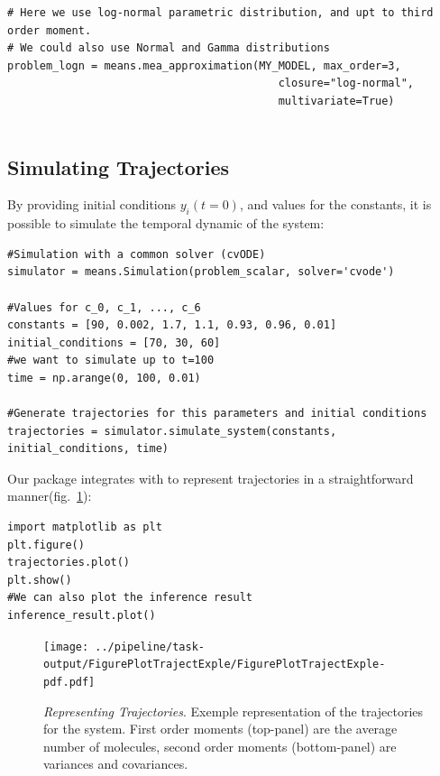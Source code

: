 \begin{framed}
\begin{verbatim}
# Here we use log-normal parametric distribution, and upt to third order moment.
# We could also use Normal and Gamma distributions
problem_logn = means.mea_approximation(MY_MODEL, max_order=3,
                                          closure="log-normal",
                                          multivariate=True)
                                          
\end{verbatim}
\end{framed}

\subsection{Simulating Trajectories}
\label{sec:example-simulation}
By providing initial conditions $y_i(t=0)$, and values for the constants, it is possible to simulate the temporal dynamic of the system:



\begin{framed}
\begin{verbatim}
#Simulation with a common solver (cvODE)
simulator = means.Simulation(problem_scalar, solver='cvode')

#Values for c_0, c_1, ..., c_6
constants = [90, 0.002, 1.7, 1.1, 0.93, 0.96, 0.01]
initial_conditions = [70, 30, 60]
#we want to simulate up to t=100
time = np.arange(0, 100, 0.01)

#Generate trajectories for this parameters and initial conditions
trajectories = simulator.simulate_system(constants, initial_conditions, time)
\end{verbatim}
\end{framed}


Our package integrates with \plt{} to represent trajectories in a straightforward manner(fig.~\ref{fig:trajectories_exple}):

\begin{framed}
\begin{verbatim}
import matplotlib as plt
plt.figure()
trajectories.plot()
plt.show()
#We can also plot the inference result
inference_result.plot()
\end{verbatim}
\end{framed}

\begin{figure}
\texttt{[image: ../pipeline/task-output/FigurePlotTrajectExple/FigurePlotTrajectExple-pdf.pdf]}

\caption{\emph{Representing Trajectories}.
Exemple representation of the trajectories for the \pft{} system.
First order moments (top-panel) are the average number of molecules, second order moments (bottom-panel) are variances and covariances.
}
\label{fig:trajectories_exple}
\end{figure}


